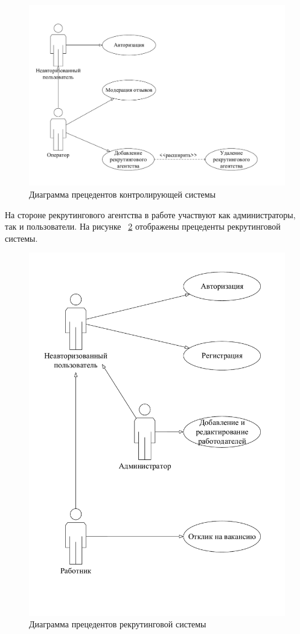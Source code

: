 \begin{figure}[ht]
  \centering
  \includegraphics[width=\textwidth]{include/usecase1.pdf}
  \caption{Диаграмма прецедентов контролирующей системы}
  \label{fig:usecase1}
\end{figure}

На стороне рекрутингового агентства в работе участвуют как администраторы, так и пользователи. На рисунке ~\ref{fig:usecase2} отображены прецеденты рекрутинговой системы.

\begin{figure}[ht]
  \centering
  \includegraphics[width=\textwidth]{include/usecase2.pdf}
  \caption{Диаграмма прецедентов рекрутинговой системы}
  \label{fig:usecase2}
\end{figure}

